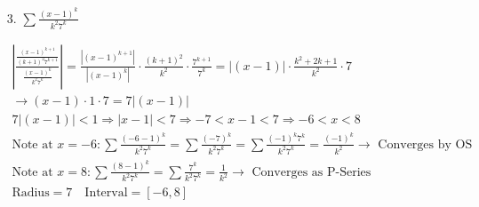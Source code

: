 \begin{itemize}
        \item [3.] $\sum\frac{(x-1)^{k}}{k^{2}7^{k}}$
        \\
        \begin{mdframed}
            \begin{equation*}
                \begin{gathered}
                    \left|\frac{\frac{(x-1)^{k+1}}{(k+1)^{2}7^{k+1}}}
                            {\frac{(x-1)^{k}}{k^{2}7^{k}}}\right| =
                            \frac{|(x-1)^{k+1}|}{|(x-1)^{k}|}\cdot
                            \frac{(k+1)^{2}}{k^{2}}\cdot
                            \frac{7^{k+1}}{7^{k}} =
                            |(x-1)|\cdot\frac{k^{2}+2k+1}{k^{2}}\cdot 7     \\
                            \rightarrow (x-1) \cdot 1 \cdot 7 = 7|(x-1)|    \\
                            7|(x-1)| < 1 \Rightarrow |x-1| < 7 \Rightarrow
                            -7 < x - 1 < 7 \Rightarrow -6 < x < 8           \\
                            \text{Note at } x = -6: \sum\frac{(-6-1)^{k}}{k^{2}7^{k}} =
                            \sum\frac{(-7)^{k}}{k^{2}7^{k}} = 
                            \sum\frac{(-1)^{k}7^{k}}{k^{2}7^{k}} =
                            \frac{(-1)^{k}}{k^{2}} \rightarrow \text{ Converges by OS}  \\
                            \text{Note at } x = 8: \sum\frac{(8-1)^{k}}{k^{2}7^{k}} =
                            \sum\frac{7^{k}}{k^{2}7^{k}} = 
                            \frac{1}{k^{2}} \rightarrow \text{ Converges as P-Series}   \\
                            \text{Radius} = 7 \quad \text{Interval} = \left[-6,8\right]
                \end{gathered}
            \end{equation*}
        \end{mdframed}


\end{itemize}
